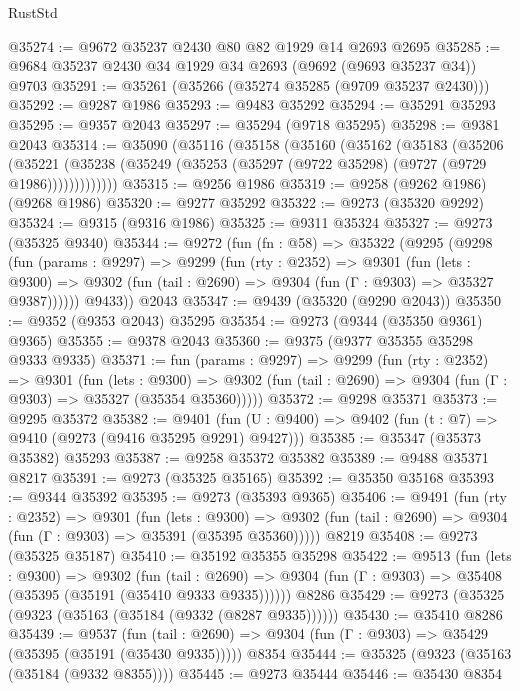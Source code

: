 \begin{lexlean}{RustStd}
\begin{coremodule}
@35274 := @9672 @35237 @2430 @80 @82 @1929 @14 @2693 @2695
@35285 := @9684 @35237 @2430 @34 @1929 @34 @2693 (@9692 (@9693 @35237 @34)) @9703
@35291 := @35261 (@35266 (@35274 @35285 (@9709 @35237 @2430)))
@35292 := @9287 @1986
@35293 := @9483 @35292
@35294 := @35291 @35293
@35295 := @9357 @2043
@35297 := @35294 (@9718 @35295)
@35298 := @9381 @2043
@35314 := @35090
    (@35116
      (@35158
        (@35160
          (@35162
            (@35183
              (@35206
                (@35221
                  (@35238 (@35249 (@35253 (@35297 (@9722 @35298) (@9727 (@9729 @1986)))))))))))))
@35315 := @9256 @1986
@35319 := @9258 (@9262 @1986) (@9268 @1986)
@35320 := @9277 @35292
@35322 := @9273 (@35320 @9292)
@35324 := @9315 (@9316 @1986)
@35325 := @9311 @35324
@35327 := @9273 (@35325 @9340)
@35344 := @9272
    (fun (fn : @58) =>
    @35322
      (@9295
        (@9298
          (fun (params : @9297) =>
          @9299
            (fun (rty : @2352) =>
            @9301
              (fun (lets : @9300) =>
              @9302 (fun (tail : @2690) => @9304 (fun (Γ : @9303) => @35327 @9387))))))
        @9433))
    @2043
@35347 := @9439 (@35320 (@9290 @2043))
@35350 := @9352 (@9353 @2043) @35295
@35354 := @9273 (@9344 (@35350 @9361) @9365)
@35355 := @9378 @2043
@35360 := @9375 (@9377 @35355 @35298 @9333 @9335)
@35371 := fun (params : @9297) =>
  @9299
    (fun (rty : @2352) =>
    @9301
      (fun (lets : @9300) =>
      @9302 (fun (tail : @2690) => @9304 (fun (Γ : @9303) => @35327 (@35354 @35360)))))
@35372 := @9298 @35371
@35373 := @9295 @35372
@35382 := @9401
    (fun (U : @9400) => @9402 (fun (t : @7) => @9410 (@9273 (@9416 @35295 @9291) @9427)))
@35385 := @35347 (@35373 @35382) @35293
@35387 := @9258 @35372 @35382
@35389 := @9488 @35371 @8217
@35391 := @9273 (@35325 @35165)
@35392 := @35350 @35168
@35393 := @9344 @35392
@35395 := @9273 (@35393 @9365)
@35406 := @9491
    (fun (rty : @2352) =>
    @9301
      (fun (lets : @9300) =>
      @9302 (fun (tail : @2690) => @9304 (fun (Γ : @9303) => @35391 (@35395 @35360)))))
    @8219
@35408 := @9273 (@35325 @35187)
@35410 := @35192 @35355 @35298
@35422 := @9513
    (fun (lets : @9300) =>
    @9302
      (fun (tail : @2690) =>
      @9304 (fun (Γ : @9303) => @35408 (@35395 (@35191 (@35410 @9333 @9335))))))
    @8286
@35429 := @9273 (@35325 (@9323 (@35163 (@35184 (@9332 (@8287 @9335))))))
@35430 := @35410 @8286
@35439 := @9537
    (fun (tail : @2690) => @9304 (fun (Γ : @9303) => @35429 (@35395 (@35191 (@35430 @9335)))))
    @8354
@35444 := @35325 (@9323 (@35163 (@35184 (@9332 @8355))))
@35445 := @9273 @35444
@35446 := @35430 @8354

\end{coremodule}
\end{lexlean}
